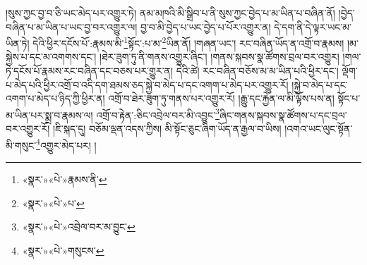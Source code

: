 །སུས་ཀྱང་བྱ་བ་ཅི་ཡང་མེད་པར་འགྱུར་ཏེ། ནམ་མཁའི་མི་སྒྲིབ་པ་ནི་སུས་ཀྱང་བྱེད་པ་མ་ཡིན་པ་བཞིན་ནོ། །བྱེད་བཞིན་པ་མ་ཡིན་པ་ཡང་བྱ་བར་འགྱུར་ལ། བྱ་བ་མི་བྱེད་པ་ཡང་བྱེད་པ་པོར་འགྱུར་ན། དེ་དག་ནི་དེ་ལྟར་ཡང་མ་ཡིན་ཏེ། དེའི་ཕྱིར་དངོས་པོ་:རྣམས་མི་\footnote{«སྣར་»«པེ་»རྣམས་ནི་}སྟོང་:པ་མ་\footnote{«སྣར་»«པེ་»པ་}ཡིན་ནོ། །གཞན་ཡང་། རང་བཞིན་ཡོད་ན་འགྲོ་བ་རྣམས། །མ་སྐྱེས་པ་དང་མ་འགགས་དང་། །ཐེར་ཟུག་ཏུ་ནི་གནས་འགྱུར་ཞིང་། །གནས་སྐབས་སྣ་ཚོགས་བྲལ་བར་འགྱུར། །གལ་ཏེ་དངོས་པོ་རྣམས་རང་བཞིན་དང་བཅས་པར་གྱུར་ན། དེའི་ཚེ། རང་བཞིན་བཅོས་མ་མ་ཡིན་པའི་ཕྱིར་དང་། ལྡོག་པ་མེད་པའི་ཕྱིར་འགྲོ་བ་འདི་དག་ཐམས་ཅད་སྐྱེ་བ་མེད་པ་དང་འགག་པ་མེད་པར་འགྱུར་རོ། །སྐྱེ་བ་མེད་པ་དང་འགག་པ་མེད་པ་ཉིད་ཀྱི་ཕྱིར་ན། འགྲོ་བ་ཐེར་ཟུག་ཏུ་གནས་པར་འགྱུར་རོ། །རྒྱུ་དང་རྐྱེན་ལ་མི་ལྟོས་པས་ན། སྟོང་པ་མ་ཡིན་པར་སྨྲ་བ་རྣམས་ལ། འགྲོ་བ་རྟེན་:ཅིང་འབྲེལ་བར་མི་འབྱུང་\footnote{«སྣར་»«པེ་»འབྲེལ་བར་མ་བྱུང་}ཞིང་གནས་སྐབས་སྣ་ཚོགས་པ་དང་བྲལ་བར་འགྱུར་རོ། །ཇི་སྐད་དུ། བཅོམ་ལྡན་འདས་ཀྱིས། མི་སྟོང་ཅུང་ཞིག་ཡོད་ན་རྒྱལ་བ་ཡིས། །འགའ་ཡང་ལུང་སྟོན་མི་གསུང་\footnote{«སྣར་»«པེ་»གསུངས་}འགྱུར་མེད་པར། །
